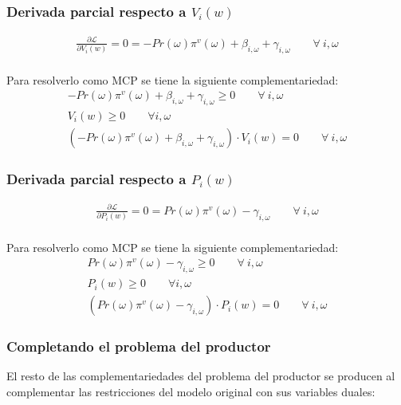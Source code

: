 \subsubsection{Derivada parcial respecto a $V_i(w)$}
\footnotesize{
\begin{align}
   \frac{\partial \mathcal{L} }{\partial V_i(w)}= 0
   = -Pr(\omega) \pi^v(\omega) + \beta_{i,\omega}  + \gamma_{i,\omega}  \qquad \forall \  i, \omega \\
\end{align}
}

Para resolverlo como MCP se tiene la siguiente complementariedad:
\footnotesize{
\begin{align}
    -Pr(\omega) \pi^v(\omega) + \beta_{i,\omega}  + \gamma_{i,\omega} \geq 0 \qquad \forall \  i, \omega \\
    V_i(w) \geq 0 \qquad \forall  i,\omega \\
    (-Pr(\omega) \pi^v(\omega) + \beta_{i,\omega}  + \gamma_{i,\omega}) \cdot  V_i(w) = 0  \qquad \forall \  i, \omega 
\end{align}
}

\subsubsection{Derivada parcial respecto a $P_i(w)$}
\footnotesize{
\begin{align}
   \frac{\partial \mathcal{L} }{\partial P_i(w)}= 0
   = Pr(\omega) \pi^v(\omega) -\gamma_{i,\omega} \qquad \forall \  i, \omega \\
\end{align}
}

Para resolverlo como MCP se tiene la siguiente complementariedad:
\footnotesize{
\begin{align}
    Pr(\omega) \pi^v(\omega) -\gamma_{i,\omega} \geq 0 \qquad \forall \  i, \omega \\
    P_i(w) \geq 0 \qquad \forall  i,\omega \\
    (Pr(\omega) \pi^v(\omega) -\gamma_{i,\omega}) \cdot  P_i(w) = 0  \qquad \forall \  i, \omega 
\end{align}
}

\subsubsection{Completando el problema del productor}
El resto de las complementariedades del problema del productor se producen al complementar las restricciones del modelo original con sus variables duales:

